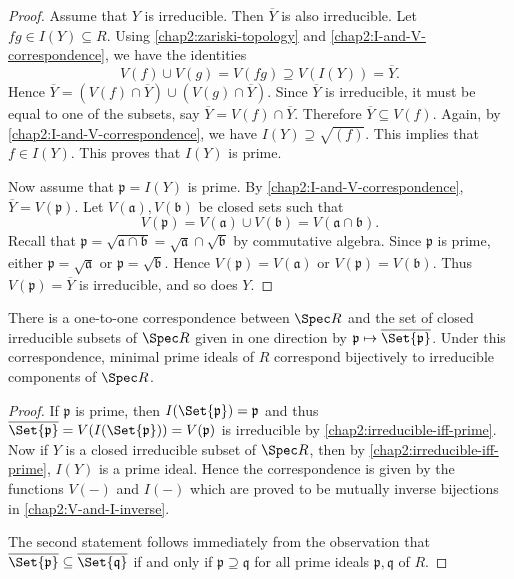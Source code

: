 \begin{proof}
	Assume that $Y$ is irreducible. Then $\overline{Y}$ is also irreducible. Let $fg \in I(Y) \subseteq R$. Using \cref{chap2:zariski-topology} and \cref{chap2:I-and-V-correspondence}, we have the identities
	\begin{equation*}
		V(f) \cup V(g) = V(fg) \supseteq V(I(Y)) = \overline{Y}.
	\end{equation*} 
	Hence $\overline{Y} = (V(f) \cap \overline{Y}) \cup (V(g) \cap \overline{Y})$. Since $\overline{Y}$ is irreducible, it must be equal to one of the subsets, say $\overline{Y} = V(f) \cap \overline{Y}$. Therefore $\overline{Y} \subseteq V(f)$. Again, by \cref{chap2:I-and-V-correspondence}, we have $I(Y) \supseteq \sqrt{(f)}$. This implies that $f \in I(Y)$. This proves that $I(Y)$ is prime.
	
	Now assume that $\mathfrak{p} = I(Y)$ is prime. By \cref{chap2:I-and-V-correspondence}, $\overline{Y} = V(\mathfrak{p})$. Let $V(\mathfrak{a}), V(\mathfrak{b})$ be closed sets such that
	\begin{equation*}
		V(\mathfrak{p}) = V(\mathfrak{a}) \cup V(\mathfrak{b}) = V(\mathfrak{a}\cap \mathfrak{b}).
	\end{equation*}
	Recall that  $\mathfrak{p} = \sqrt{\mathfrak{a} \cap \mathfrak{b}} = \sqrt{\mathfrak{a}} \cap \sqrt{\mathfrak{b}}$ by commutative algebra. Since $\mathfrak{p}$ is prime, either $\mathfrak{p} = \sqrt{\mathfrak{a}}$ or $\mathfrak{p} = \sqrt{\mathfrak{b}}$. Hence $V(\mathfrak{p}) = V(\mathfrak{a})$ or $V(\mathfrak{p}) = V(\mathfrak{b})$. Thus $V(\mathfrak{p}) = \overline{Y}$ is irreducible, and so does $Y$.
\end{proof}

\begin{proposition}\label{chap2:correspondence-closed-irreducible-minimal}
	There is a one-to-one correspondence between $\Spec R$ and the set of closed irreducible subsets of $\Spec R$ given in one direction by $\mathfrak{p} \mapsto \overline{\Set{\mathfrak{p}}}$. Under this correspondence, minimal prime ideals of $R$ correspond bijectively to irreducible components of $\Spec R$.
\end{proposition}
\begin{proof}
	If $\mathfrak{p}$ is prime, then $I(\Set{\mathfrak{p}}) = \mathfrak{p}$ and thus $\overline{\mathfrak{\Set{p}}} = V(I(\Set{\mathfrak{p}})) = V(\mathfrak{p})$ is irreducible by \cref{chap2:irreducible-iff-prime}. Now if $Y$ is a closed irreducible subset of $\Spec R$, then by \cref{chap2:irreducible-iff-prime}, $I(Y)$ is a prime ideal. Hence the correspondence is given by the functions $V(-)$ and $I(-)$ which are proved to be mutually inverse bijections in \cref{chap2:V-and-I-inverse}. 
	
	The second statement follows immediately from the observation that $\overline{\Set{\mathfrak{p}}} \subseteq \overline{\Set{\mathfrak{q}}}$ if and only if $\mathfrak{p} \supseteq \mathfrak{q}$ for all prime ideals $\mathfrak{p}, \mathfrak{q}$ of $R$. 
\end{proof}

